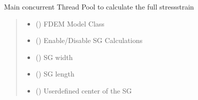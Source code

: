 \documentclass[letterpaper,10pt,english]{sphinxmanual}
\begin{document}
\begin{fulllineitems}
\label{\detokenize{openfdem:openfdem.complete_BD_thread_pool_generators.main}}
\pysigstartsignatures
{}
\pysigstopsignatures
\sphinxAtStartPar
Main concurrent Thread Pool to calculate the full stress\sphinxhyphen{}strain
\begin{quote}\begin{description}
\begin{itemize}
\item {} 
\sphinxAtStartPar
{} ({\hyperref[\detokenize{openfdem:openfdem.openfdem.Model}]{}}) \textendash{} FDEM Model Class

\item {} 
\sphinxAtStartPar
{} () \textendash{} Enable/Disable SG Calculations

\item {} 
\sphinxAtStartPar
{} () \textendash{} SG width

\item {} 
\sphinxAtStartPar
{} () \textendash{} SG length

\item {} 
\sphinxAtStartPar
{} (\sphinxstyleliteralemphasis{\sphinxupquote{{[}}}\sphinxstyleliteralemphasis{\sphinxupquote{, }}\sphinxstyleliteralemphasis{\sphinxupquote{, }}\sphinxstyleliteralemphasis{\sphinxupquote{{]}}}) \textendash{} User\sphinxhyphen{}defined center of the SG


\end{itemize}
\end{description}
\end{quote}
\end{fulllineitems}
\end{document}

